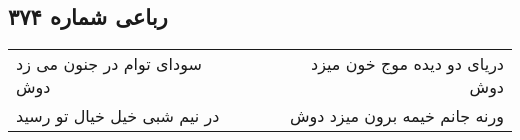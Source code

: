 \begin{center}
\section*{رباعی شماره ۳۷۴}
\label{sec:sh374}
\begin{longtable}{l p{0.5cm} r}
سودای توام در جنون می زد دوش
&&
دریای دو دیده موج خون میزد دوش
\\
در نیم شبی خیل خیال تو رسید
&&
ورنه جانم خیمه برون میزد دوش
\\
\end{longtable}
\end{center}
